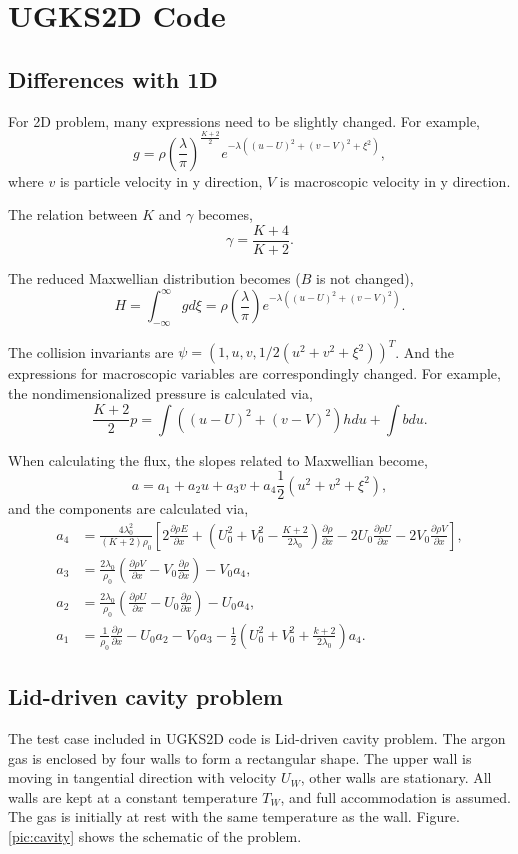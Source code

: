 \documentclass[a4paper]{book}
\begin{document}
\section{UGKS2D Code}
\subsection{Differences with 1D}
For 2D problem, many expressions need to be slightly changed. For example,
$$g=\rho\left(\frac{\lambda}{\pi}\right)^{\frac{K+2}{2}}e^{-\lambda((u-U)^2+(v-V)^2+\xi^2)},$$
where $v$ is particle velocity in y direction, $V$ is macroscopic velocity in y direction. 

The relation between $K$ and $\gamma$ becomes,
$$\gamma=\frac{K+4}{K+2}.$$

The reduced Maxwellian distribution becomes ($B$ is not changed),
$$H=\int_{-\infty}^{\infty}gd\xi=\rho\left(\frac{\lambda}{\pi}\right)e^{-\lambda((u-U)^2+(v-V)^2)}.$$

The collision invariants are $\psi=(1,u,v,1/2(u^2+v^2+\xi^2))^T$. And the expressions for macroscopic variables are correspondingly changed. For example, the nondimensionalized pressure is calculated via,
$$\frac{K+2}{2}p=\int((u-U)^2+(v-V)^2)hdu+\int bdu.$$

When calculating the flux, the slopes related to Maxwellian become,
$$a=a_1+a_2u+a_3v+a_4\frac{1}{2}(u^2+v^2+\xi^2),$$
and the components are calculated via,
$$
\begin{aligned}
    a_4&=\frac{4\lambda_0^2}{(K+2)\rho_0}\left[2\frac{\partial\rho E}{\partial x}+\left(U_0^2+V_0^2-\frac{K+2}{2\lambda_0}\right)\frac{\partial\rho}{\partial x}-2U_0\frac{\partial\rho U}{\partial x}-2V_0\frac{\partial\rho V}{\partial x}\right],\\
    a_3&=\frac{2\lambda_0}{\rho_0}\left(\frac{\partial\rho V}{\partial x}-V_0\frac{\partial\rho}{\partial x}\right)-V_0a_4,\\
    a_2&=\frac{2\lambda_0}{\rho_0}\left(\frac{\partial\rho U}{\partial x}-U_0\frac{\partial\rho}{\partial x}\right)-U_0a_4,\\
    a_1&=\frac{1}{\rho_0}\frac{\partial\rho}{\partial x}-U_0a_2-V_0a_3-\frac{1}{2}\left(U_0^2+V_0^2+\frac{k+2}{2\lambda_0}\right)a_4.
\end{aligned}
$$

\subsection{Lid-driven cavity problem}
The test case included in UGKS2D code is Lid-driven cavity problem\cite{Huang2012}. The argon gas is enclosed by four walls to form a rectangular shape. The upper wall is moving in tangential direction with velocity $U_W$, other walls are stationary. All walls are kept at a constant temperature $T_W$, and full accommodation is assumed. The gas is initially at rest with the same temperature as the wall.  Figure. \ref{pic:cavity} shows the schematic of the problem.
\end{document}

